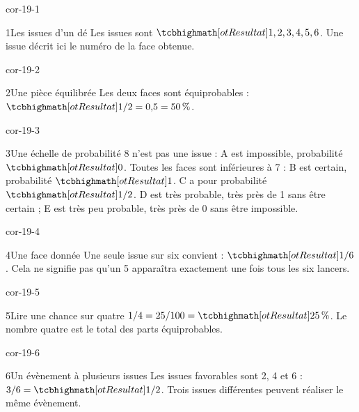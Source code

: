 \clearpage\pagestyle{otMain}\setlength{\otBlocEspacement}{2.5mm}\fontsize{11}{15}\selectfont{}
\begin{blocLivre}{cor-19-1}\begin{corrige}{1}{Les issues d’un dé}
Les issues sont $\res{1,2,3,4,5,6}$. Une issue décrit ici le numéro de la face obtenue.
\end{corrige}\end{blocLivre}
\begin{blocLivre}{cor-19-2}\begin{corrige}{2}{Une pièce équilibrée}
Les deux faces sont équiprobables : $\res{1/2=0{,}5=50\,\%}$.
\end{corrige}\end{blocLivre}
\begin{blocLivre}{cor-19-3}\begin{corrige}{3}{Une échelle de probabilité}
8 n’est pas une issue : A est impossible, probabilité $\res0$. Toutes les faces sont inférieures à 7 : B est certain, probabilité $\res1$. C a pour probabilité $\res{1/2}$. D est très probable, très près de 1 sans être certain ; E est très peu probable, très près de 0 sans être impossible.
\label{fig-cor-19-3}
\end{corrige}\end{blocLivre}
\begin{blocLivre}{cor-19-4}\begin{corrige}{4}{Une face donnée}
Une seule issue sur six convient : $\res{1/6}$. Cela ne signifie pas qu’un 5 apparaîtra exactement une fois tous les six lancers.
\end{corrige}\end{blocLivre}
\begin{blocLivre}{cor-19-5}\begin{corrige}{5}{Lire une chance sur quatre}
$1/4=25/100=\res{25\,\%}$. Le nombre quatre est le total des parts équiprobables.
\end{corrige}\end{blocLivre}
\begin{blocLivre}{cor-19-6}\begin{corrige}{6}{Un évènement à plusieurs issues}
Les issues favorables sont 2, 4 et 6 : $3/6=\res{1/2}$. Trois issues différentes peuvent réaliser le même évènement.
\end{corrige}\end{blocLivre}
